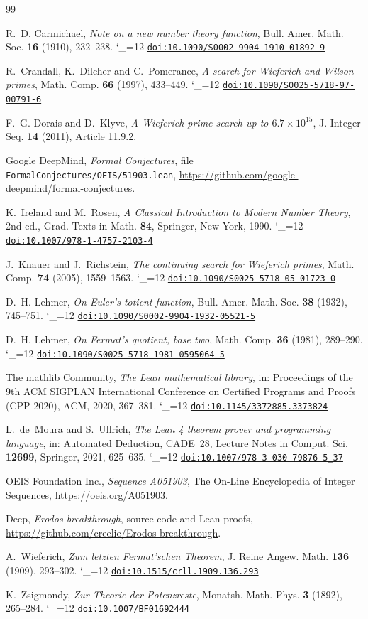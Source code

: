 \documentclass[11pt]{amsart}
\makeatletter
\newcommand{\doi}{\begingroup\catcode`\_=12 \doi@}
\newcommand{\doi@}[1]{\href{https://doi.org/#1}{\nolinkurl{doi:#1}}\endgroup}
\theoremstyle{remark}
\makeatother
\begin{document}
\begin{thebibliography}{99}

R.~D. Carmichael, \emph{Note on a new number theory function}, Bull. Amer. Math. Soc.
\textbf{16} (1910), 232--238. \doi{10.1090/S0002-9904-1910-01892-9}

R.~Crandall, K.~Dilcher and C.~Pomerance, \emph{A search for Wieferich and Wilson primes},
Math. Comp. \textbf{66} (1997), 433--449. \doi{10.1090/S0025-5718-97-00791-6}

F.~G. Dorais and D.~Klyve, \emph{A Wieferich prime search up to $6.7\times10^{15}$}, J.
Integer Seq. \textbf{14} (2011), Article 11.9.2.

Google DeepMind, \emph{Formal Conjectures}, file
\texttt{FormalConjectures/OEIS/51903.lean},
\url{https://github.com/google-deepmind/formal-conjectures}.

K.~Ireland and M.~Rosen, \emph{A Classical Introduction to Modern Number Theory}, 2nd ed.,
Grad. Texts in Math. \textbf{84}, Springer, New York, 1990.
\doi{10.1007/978-1-4757-2103-4}

J.~Knauer and J.~Richstein, \emph{The continuing search for Wieferich primes}, Math. Comp.
\textbf{74} (2005), 1559--1563. \doi{10.1090/S0025-5718-05-01723-0}

D.~H. Lehmer, \emph{On Euler's totient function}, Bull. Amer. Math. Soc. \textbf{38} (1932),
745--751. \doi{10.1090/S0002-9904-1932-05521-5}

D.~H. Lehmer, \emph{On Fermat's quotient, base two}, Math. Comp. \textbf{36} (1981),
289--290. \doi{10.1090/S0025-5718-1981-0595064-5}

The mathlib Community, \emph{The Lean mathematical library}, in: Proceedings of the 9th ACM
SIGPLAN International Conference on Certified Programs and Proofs (CPP 2020), ACM, 2020,
367--381. \doi{10.1145/3372885.3373824}

L.~de~Moura and S.~Ullrich, \emph{The Lean 4 theorem prover and programming language}, in:
Automated Deduction, CADE~28, Lecture Notes in Comput. Sci. \textbf{12699}, Springer, 2021,
625--635. \doi{10.1007/978-3-030-79876-5_37}

OEIS Foundation Inc., \emph{Sequence A051903}, The On-Line Encyclopedia of Integer
Sequences, \url{https://oeis.org/A051903}.

Deep, \emph{Erodos-breakthrough}, source code and Lean proofs,
\url{https://github.com/creelie/Erodos-breakthrough}.

A.~Wieferich, \emph{Zum letzten Fermat'schen Theorem}, J. Reine Angew. Math. \textbf{136}
(1909), 293--302. \doi{10.1515/crll.1909.136.293}

K.~Zsigmondy, \emph{Zur Theorie der Potenzreste}, Monatsh. Math. Phys. \textbf{3} (1892),
265--284. \doi{10.1007/BF01692444}

\end{thebibliography}
\end{document}
